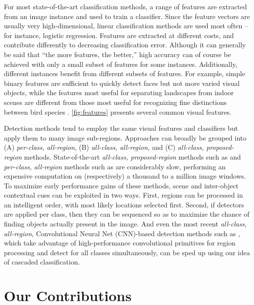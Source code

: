 For most state-of-the-art classification methods, a range of features are extracted from an image instance and used to train a classifier.
Since the feature vectors are usually very high-dimensional, linear classification methods are used most often -- for instance, logistic regression.
Features are extracted at different costs, and contribute differently to decreasing classification error.
Although it can generally be said that ``the more features, the better,'' high accuracy can of course be achieved with only a small subset of features for some instances.
Additionally, different instances benefit from different subsets of features.
For example, simple binary features are sufficient to quickly detect faces \parencite{Viola-IJCV-2004} but not more varied visual objects, while the features most useful for separating landscapes from indoor scenes \parencite{Xiao-CVPR-2010} are different from those most useful for recognizing fine distinctions between bird species \parencite{Farrell-ICCV-2011}.
\autoref{fig:features} presents several common visual features.

Detection methods tend to employ the same visual features and classifiers but apply them to many image sub-regions.
Approaches can broadly be grouped into (A) \emph{per-class, all-region}, (B) \emph{all-class, all-region}, and (C) \emph{all-class, proposed-region} methods.
State-of-the-art \emph{all-class, proposed-region} methods such as \cite{Girshick-CVPR-2014} and \emph{per-class, all-region} methods such as \cite{Felzenszwalb2010a} are considerably slow, performing an expensive computation on (respectively) a thousand to a million image windows.
To maximize early performance gains of these methods, scene and inter-object contextual cues can be exploited in two ways.
First, regions can be processed in an intelligent order, with most likely locations selected first.
Second, if detectors are applied per class, then they can be sequenced so as to maximize the chance of finding objects actually present in the image.
And even the most recent \emph{all-class, all-region}, Convolutional Neural Net (CNN)-based detection methods such as \cite{He-ECCV-2014}, which take advantage of high-performance convolutional primitives for region processing and detect for all classes simultaneously, can be sped up using our idea of cascaded classification.

\section{Our Contributions}

